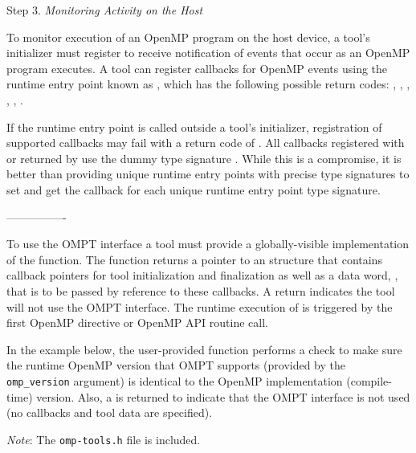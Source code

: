 Step 3. \emph{Monitoring Activity on the Host}
\begin{adjustwidth}{2.5em}{0pt}
To monitor execution of an OpenMP program on the host device, a tool's initializer
must register to receive notification of events that occur as an OpenMP program executes.
A tool can register callbacks for OpenMP events using the runtime entry point known
as , which has the following possible return codes: \hfill \break
 ,
 ,
 ,
 ,
 ,
 .

If the  runtime entry point is called outside a tool's initializer,
registration of supported callbacks may fail with a return code of .
All callbacks registered with  or returned by 
use the dummy type signature . While this is a compromise, it is
better than providing unique runtime entry points with precise type signatures
to set and get the callback for each unique runtime entry point type signature.
\end{adjustwidth}

----------------

To use the OMPT interface a tool must provide a globally-visible implementation
of the  function.
The function returns a pointer to an  structure 
that contains callback pointers for tool initialization and finalization as well 
as a data word, , that is to be passed by reference to these callbacks.
A  return indicates the tool will not use the OMPT interface.
The runtime execution of  is triggered by the first OpenMP 
directive or OpenMP API routine call.


In the example below, the user-provided  function
performs a check to make sure the runtime OpenMP version that OMPT supports 
(provided by the \texttt{omp\_version} argument) is identical to the 
OpenMP implementation (compile-time) version.
Also, a  is returned to indicate that the OMPT interface is not
used (no callbacks and tool data are specified). 

\emph{Note}: The \texttt{omp-tools.h} file is included.

